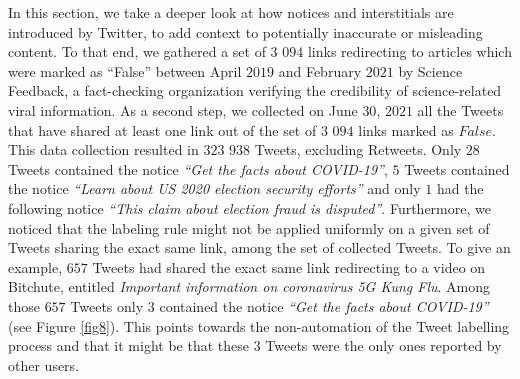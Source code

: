 \documentclass{article}
\begin{document}
\smallskip

In this section, we take a deeper look at how notices and interstitials are introduced by Twitter, to add context to potentially inaccurate or misleading content. To that end, we gathered a set of $3$ $094$ links redirecting to articles which were marked as ``False'' between April $2019$ and February $2021$ by Science Feedback, a fact-checking organization verifying the credibility of science-related viral information. 
As a second step, we collected on June $30$, $2021$ all the Tweets that have shared at least one link out of the set of $3$ $094$ links marked as $False$. This data collection resulted in $323$ $938$ Tweets, excluding Retweets. Only $28$ Tweets contained the notice { \it ``Get the facts about COVID-19''}, $5$ Tweets contained the notice {\it ``Learn about US 2020 election security efforts''} and only $1$ had the following notice {\it ``This claim about election fraud is disputed''}. Furthermore, we noticed that the labeling rule might not be applied uniformly on a given set of Tweets sharing the exact same link, among the set of collected Tweets. To give an example, $657$ Tweets had shared the exact same link redirecting to a video on Bitchute, entitled {\it Important information on coronavirus 5G Kung Flu}. Among those $657$ Tweets only $3$ contained the notice {\it ``Get the facts about COVID-19''} (see Figure \ref{fig8}). This points towards the non-automation of the Tweet labelling process and that it might be that these $3$ Tweets were the only ones reported by other users. 

\smallskip
\end{document}
